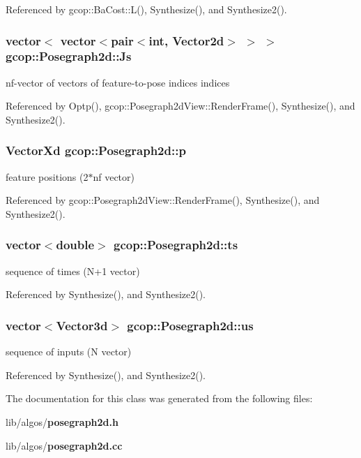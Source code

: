 \-Referenced by gcop\-::\-Ba\-Cost\-::\-L(), \-Synthesize(), and \-Synthesize2().

\subsubsection[{\-Js}]{\setlength{\rightskip}{0pt plus 5cm}vector$<$ vector$<$pair$<$int, \-Vector2d$>$ $>$ $>$ {\bf gcop\-::\-Posegraph2d\-::\-Js}}\label{classgcop_1_1Posegraph2d_ac22baf33271679f56f8685ee1213fa56}


nf-\/vector of vectors of feature-\/to-\/pose indices indices 



\-Referenced by \-Optp(), gcop\-::\-Posegraph2d\-View\-::\-Render\-Frame(), \-Synthesize(), and \-Synthesize2().

\subsubsection[{p}]{\setlength{\rightskip}{0pt plus 5cm}\-Vector\-Xd {\bf gcop\-::\-Posegraph2d\-::p}}\label{classgcop_1_1Posegraph2d_a45448dafabb4923ddfc9e74aca505421}


feature positions (2$\ast$nf vector) 



\-Referenced by gcop\-::\-Posegraph2d\-View\-::\-Render\-Frame(), \-Synthesize(), and \-Synthesize2().

\subsubsection[{ts}]{\setlength{\rightskip}{0pt plus 5cm}vector$<$double$>$ {\bf gcop\-::\-Posegraph2d\-::ts}}\label{classgcop_1_1Posegraph2d_a3161ec9056cf2fcf7bc3dfcbd139ede4}


sequence of times (\-N+1 vector) 



\-Referenced by \-Synthesize(), and \-Synthesize2().

\subsubsection[{us}]{\setlength{\rightskip}{0pt plus 5cm}vector$<$\-Vector3d$>$ {\bf gcop\-::\-Posegraph2d\-::us}}\label{classgcop_1_1Posegraph2d_acf06918b87b9bf108f291a2c53b45cfc}


sequence of inputs (\-N vector) 



\-Referenced by \-Synthesize(), and \-Synthesize2().



\-The documentation for this class was generated from the following files\-:\begin{DoxyCompactItemize}
\item 
lib/algos/{\bf posegraph2d.\-h}\item 
lib/algos/{\bf posegraph2d.\-cc}\end{DoxyCompactItemize}
